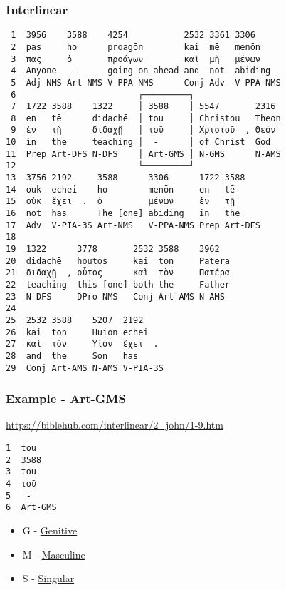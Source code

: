 \documentclass[11pt]{article}
\begin{document}
\subsubsection{Interlinear}
\label{sec:orgad83ec6}

\begin{verbatim}
 1  3956    3588    4254           2532 3361 3306
 2  pas     ho      proagōn        kai  mē   menōn
 3  πᾶς     ὁ       προάγων        καὶ  μὴ   μένων
 4  Anyone   -      going on ahead and  not  abiding
 5  Adj-NMS Art-NMS V-PPA-NMS      Conj Adv  V-PPA-NMS
 6                        ┌─────────┐
 7  1722 3588    1322     │ 3588    │ 5547       2316
 8  en   tē      didachē  │ tou     │ Christou   Theon
 9  ἐν   τῇ      διδαχῇ   │ τοῦ     │ Χριστοῦ  , Θεὸν
10  in   the     teaching │  -      │ of Christ  God
11  Prep Art-DFS N-DFS    │ Art-GMS │ N-GMS      N-AMS
12                        └─────────┘
13  3756 2192     3588      3306      1722 3588
14  ouk  echei    ho        menōn     en   tē
15  οὐκ  ἔχει  .  ὁ         μένων     ἐν   τῇ
16  not  has      The [one] abiding   in   the
17  Adv  V-PIA-3S Art-NMS   V-PPA-NMS Prep Art-DFS
18  
19  1322      3778       2532 3588    3962
20  didachē   houtos     kai  ton     Patera
21  διδαχῇ  , οὗτος      καὶ  τὸν     Πατέρα
22  teaching  this [one] both the     Father
23  N-DFS     DPro-NMS   Conj Art-AMS N-AMS
24  
25  2532 3588    5207  2192
26  kai  ton     Huion echei
27  καὶ  τὸν     Υἱὸν  ἔχει  .
28  and  the     Son   has
29  Conj Art-AMS N-AMS V-PIA-3S
\end{verbatim}

\subsubsection{Example - Art-GMS}
\label{sec:org23ce41d}
\url{https://biblehub.com/interlinear/2\_john/1-9.htm}

\begin{verbatim}
1  tou
2  3588
3  tou
4  τοῦ
5   -
6  Art-GMS
\end{verbatim}

\begin{itemize}
\item G - \href{https://en.wikipedia.org/wiki/Grammatical\_case}{Genitive}
\item M - \href{https://en.wikipedia.org/wiki/Grammatical\_case}{Masculine}
\item S - \href{https://en.wikipedia.org/wiki/Grammatical\_case}{Singular}
\end{itemize}
\end{document}
